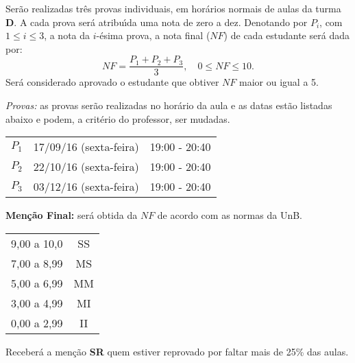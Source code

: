 \documentclass[12pt]{article}
\begin{document}
 Ser\~ao realizadas tr\^es provas individuais, em hor\'arios normais de aulas da turma \textbf{D}. A cada prova ser\'a atribu{\'\i}da uma nota de zero a dez. Denotando por $P_i$, com $1 \le i \le 3$, a nota da $i$-\'esima prova, a nota final ($NF$) de cada estudante ser\'a dada por:
\[
    NF = \dfrac{P_1 + P_2 + P_3}{3}, \quad 0 \le NF \le 10.
\]
Ser\'a considerado aprovado o estudante que obtiver $NF$ maior ou igual a 5.

\vspace{0.5cm}

\noindent\textit{Provas:} as provas ser\~ao realizadas no hor\'ario da aula e as datas est\~ao listadas abaixo e podem, a crit\'erio do professor, ser mudadas.

\begin{center}
    \begin{tabular}{c|c|c}
        \hline\hline
        \hspace{1cm}{\bf Prova}\hspace{1cm} & \hspace{3cm}{\bf Data}\hspace{3cm} & \hspace{1.7cm}{\bf Hor\'{a}rio}\hspace{1.7cm} \\
        \hline\hline
        $P_1$ & 17/09/16 (sexta-feira) \phantom{x} & 19:00 - 20:40 \\
        \hline
        $P_2$ & 22/10/16 (sexta-feira) \phantom{x} & 19:00 - 20:40 \\
        \hline
        $P_3$ & 03/12/16 (sexta-feira) \phantom{x} & 19:00 - 20:40 \\
        \hline\hline
    \end{tabular}
\end{center}

\vspace{0.5cm}
{\bf \noindent Men\c{c}\~{a}o Final:} ser\'{a} obtida da $NF$ de
acordo com as normas da UnB.
\begin{center}
    \begin{tabular}{c|c}
        \hline\hline
        \hspace{1cm}{Nota}\hspace{1cm} & \hspace{0.25cm}{Men\c{c}\~{a}o}\hspace{0.25cm}\\
        \hline\hline
        9,00 a 10,0 & SS \\
        \hline
        7,00 a 8,99 & MS \\
        \hline
        5,00 a 6,99 & MM \\
        \hline
        3,00 a 4,99 & MI \\
        \hline
        0,00 a 2,99  & II \\
        \hline\hline
    \end{tabular}
\end{center}
Receber{\'a} a men{\c c}{\~a}o {\bf SR} quem estiver reprovado por faltar mais de 25\%
das aulas.
\end{document}
